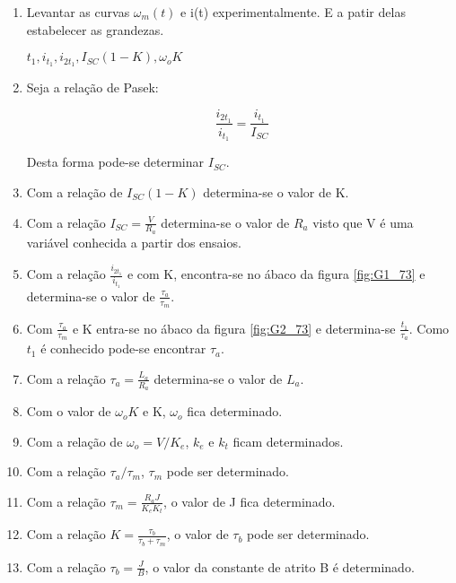 \begin{enumerate}
   \item Levantar as curvas $\omega_{m}(t)$ e i(t) experimentalmente. E a patir delas estabelecer as grandezas.
   
   $t_{1}, i_{t_{1}}, i_{2t_{1}}, I_{SC}(1-K), \omega_{o}K $
   
   \item Seja a relação de Pasek:
   
   \[\frac{i_{2t_{1}}}{i_{t_{1}}} = \frac{i_{t_{1}}}{I_{SC}}\]
   
   Desta forma pode-se determinar $I_{SC}$.
   
   \item Com a relação de $I_{SC}(1-K)$ determina-se o valor de K.
   
   \item Com a relação $I_{SC} = \frac{V}{R_{a}}$ determina-se o valor de $R_{a}$ visto que V é uma variável conhecida a partir dos ensaios.
   
   \item Com a relação $\frac{i_{2t_{1}}}{i_{t_{1}}}$ e com K, encontra-se no ábaco da figura \ref{fig:G1_73} e determina-se o valor de $\frac{\tau_{a}}{\tau_{m}}$.
   
   \item Com $\frac{\tau_{a}}{\tau_{m}}$ e K entra-se no ábaco da figura \ref{fig:G2_73} e determina-se $\frac{t_{1}}{\tau_{a}}$. Como $t_{1}$ é conhecido pode-se encontrar  $\tau_{a}$.
   
   \item Com a relação $\tau_{a} = \frac{L_{a}}{R_{a}}$ determina-se o valor de $L_{a}$.
   
   \item Com o valor de $\omega_{o}K$ e K, $\omega_{o}$ fica determinado.
   
   \item Com a relação de $\omega_{o} = V/K_{e}$, $k_{e}$ e $k_{t}$ ficam determinados.
   
   \item Com a relação $\tau_{a}/\tau_{m}$, $\tau_{m}$ pode ser determinado.
   
   \item Com a relação $\tau_{m} = \frac{R_{a}J}{K_{e}K_{t}}$, o valor de J fica determinado.
   
   \item Com a relação $K = \frac{\tau_{b}}{\tau_{b} + \tau_{m}}$, o valor de $\tau_{b}$ pode ser determinado.
   
   \item Com a relação $\tau_{b} = \frac{J}{B}$, o valor da constante de atrito B é determinado.
   

\end{enumerate}

